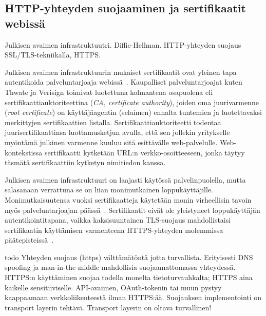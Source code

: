 \documentclass[finnish,gradu]{tktltiki}
\begin{document}



  \subsection{HTTP-yhteyden suojaaminen ja sertifikaatit webissä} %
  \label{sub:sertifikaatit_webissä}
  Julkisen avaimen infrastruktuutri.
  Diffie-Hellman.
  HTTP-yhteyden suojaus SSL/TLS-tekniikalla, HTTPS.

  Julkisen avaimen infrastruktuurin mukaiset sertifikaatit ovat yleinen tapa autentikoida palveluntarjoaja webissä~\cite{id_in_federation_systems_2005}. Kaupalliset palveluntarjoajat kuten Thwate ja Verisign toimivat luotettuna kolmantena osapuolena eli sertifikaattiauktoriteettina (\emph{CA, certificate authority}), joiden oma juurivarmenne (\emph{root certificate}) on käyttäjäagentin (selaimen) ennalta tuntemien ja luotettavaksi merkittyjen sertifikaattien listalla. Sertifikaattiauktoriteetti todentaa juurisertifikaattinsa luottamusketjun avulla, että sen jollekin yritykselle myöntämä julkinen varmenne kuuluu sitä esittävälle web-palvelulle. Web-kontekstissa sertifikaatti kytketään URL:n verkko-osoitteeseen, jonka täytyy täsmätä sertifikaattiin kytketyn nimitiedon kanssa.

  Julkisen avaimen infrastruktuuri on laajasti käytössä palvelinpuolella, mutta salasanaan verrattuna se on liian monimutkainen loppukäyttäjille. Monimutkaisuutensa vuoksi sertifikaatteja käytetään monin virheellisin tavoin myös palveluntarjoajan päässä~\cite{eff_ssliverse}. Sertifikaatit eivät ole yleistyneet loppukäyttäjän autentikointitapana, vaikka kaksisuuntainen TLS-suojaus mahdollistaisi sertifikaatin käyttämisen varmenteena HTTPS-yhteyden molemmissa päätepisteissä~\cite{henry_story_foaf_ssl, webid_home}.

  todo
  Yhteyden suojaus (https) välttämätöntä jotta turvallista. Erityisesti DNS spoofing ja man-in-the-middle mahdollisia suojaamattomassa yhteydessä.
  HTTPS:n käyttäminen suojaa todella monelta tietoturvauhkalta;
  HTTPS aina kaikelle sensitiiviselle. API-avaimen, OAuth-tokenin tai muun pystyy kaappaamaan verkkoliikenteestä ilman HTTPS:ää.  Suojauksen implementointi on transport layerin tehtävä. Transport layerin on oltava turvallinen!
\end{document}
